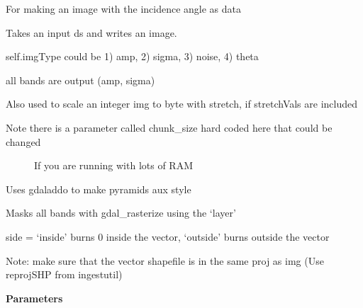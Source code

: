 \documentclass[letterpaper,10pt,openany,oneside]{sphinxmanual}
\begin{document}
\begin{fulllineitems}
\begin{fulllineitems}
\label{code:Image.Image.getTheta}
For making an image with the incidence angle as data

\end{fulllineitems}


\begin{fulllineitems}
\label{code:Image.Image.imgWrite}
Takes an input ds and writes an image.

self.imgType could be 1) amp, 2) sigma, 3) noise, 4) theta

all bands are output (amp, sigma)

Also used to scale an integer img to byte with stretch, if stretchVals are included
\begin{description}
\item[{Note there is a parameter called chunk\_size hard coded here that could be changed }] \leavevmode
If you are running with lots of RAM

\end{description}

\end{fulllineitems}


\begin{fulllineitems}
\label{code:Image.Image.makePyramids}
Uses gdaladdo to make pyramids aux style

\end{fulllineitems}


\begin{fulllineitems}
\label{code:Image.Image.maskImg}
Masks all bands with gdal\_rasterize using the `layer'

side = `inside' burns 0 inside the vector, `outside' burns outside the vector

Note: make sure that the vector shapefile is in the same proj as img (Use reprojSHP from ingestutil)

\textbf{Parameters}
\begin{quote}


\end{quote}
\end{fulllineitems}
\end{fulllineitems}
\end{document}
